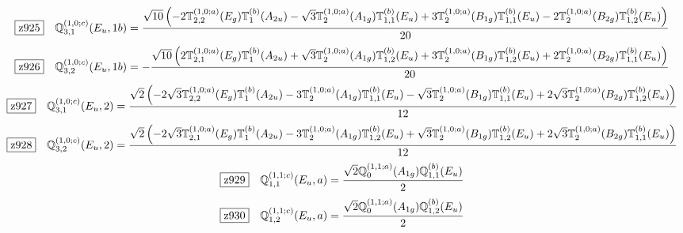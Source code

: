 \documentclass[fleqn,10pt,landscape]{jsarticle}
\begin{document}
\begin{dmath*}
\hspace*{3mm}\fbox{z925}\quad \mathbb{Q}_{3,1}^{(1,0;c)}(E_{u},1b)=\frac{\sqrt{10} \left(- 2 \mathbb{T}_{2,2}^{(1,0;a)}(E_{g}) \mathbb{T}_{1}^{(b)}(A_{2u}) - \sqrt{3} \mathbb{T}_{2}^{(1,0;a)}(A_{1g}) \mathbb{T}_{1,1}^{(b)}(E_{u}) + 3 \mathbb{T}_{2}^{(1,0;a)}(B_{1g}) \mathbb{T}_{1,1}^{(b)}(E_{u}) - 2 \mathbb{T}_{2}^{(1,0;a)}(B_{2g}) \mathbb{T}_{1,2}^{(b)}(E_{u})\right)}{20}
\end{dmath*}
\begin{dmath*}
\hspace*{3mm}\fbox{z926}\quad \mathbb{Q}_{3,2}^{(1,0;c)}(E_{u},1b)=- \frac{\sqrt{10} \left(2 \mathbb{T}_{2,1}^{(1,0;a)}(E_{g}) \mathbb{T}_{1}^{(b)}(A_{2u}) + \sqrt{3} \mathbb{T}_{2}^{(1,0;a)}(A_{1g}) \mathbb{T}_{1,2}^{(b)}(E_{u}) + 3 \mathbb{T}_{2}^{(1,0;a)}(B_{1g}) \mathbb{T}_{1,2}^{(b)}(E_{u}) + 2 \mathbb{T}_{2}^{(1,0;a)}(B_{2g}) \mathbb{T}_{1,1}^{(b)}(E_{u})\right)}{20}
\end{dmath*}
\begin{dmath*}
\hspace*{3mm}\fbox{z927}\quad \mathbb{Q}_{3,1}^{(1,0;c)}(E_{u},2)=\frac{\sqrt{2} \left(- 2 \sqrt{3} \mathbb{T}_{2,2}^{(1,0;a)}(E_{g}) \mathbb{T}_{1}^{(b)}(A_{2u}) - 3 \mathbb{T}_{2}^{(1,0;a)}(A_{1g}) \mathbb{T}_{1,1}^{(b)}(E_{u}) - \sqrt{3} \mathbb{T}_{2}^{(1,0;a)}(B_{1g}) \mathbb{T}_{1,1}^{(b)}(E_{u}) + 2 \sqrt{3} \mathbb{T}_{2}^{(1,0;a)}(B_{2g}) \mathbb{T}_{1,2}^{(b)}(E_{u})\right)}{12}
\end{dmath*}
\begin{dmath*}
\hspace*{3mm}\fbox{z928}\quad \mathbb{Q}_{3,2}^{(1,0;c)}(E_{u},2)=\frac{\sqrt{2} \left(- 2 \sqrt{3} \mathbb{T}_{2,1}^{(1,0;a)}(E_{g}) \mathbb{T}_{1}^{(b)}(A_{2u}) - 3 \mathbb{T}_{2}^{(1,0;a)}(A_{1g}) \mathbb{T}_{1,2}^{(b)}(E_{u}) + \sqrt{3} \mathbb{T}_{2}^{(1,0;a)}(B_{1g}) \mathbb{T}_{1,2}^{(b)}(E_{u}) + 2 \sqrt{3} \mathbb{T}_{2}^{(1,0;a)}(B_{2g}) \mathbb{T}_{1,1}^{(b)}(E_{u})\right)}{12}
\end{dmath*}
\begin{dmath*}
\hspace*{3mm}\fbox{z929}\quad \mathbb{Q}_{1,1}^{(1,1;c)}(E_{u},a)=\frac{\sqrt{2} \mathbb{Q}_{0}^{(1,1;a)}(A_{1g}) \mathbb{Q}_{1,1}^{(b)}(E_{u})}{2}
\end{dmath*}
\begin{dmath*}
\hspace*{3mm}\fbox{z930}\quad \mathbb{Q}_{1,2}^{(1,1;c)}(E_{u},a)=\frac{\sqrt{2} \mathbb{Q}_{0}^{(1,1;a)}(A_{1g}) \mathbb{Q}_{1,2}^{(b)}(E_{u})}{2}
\end{dmath*}
\end{document}
